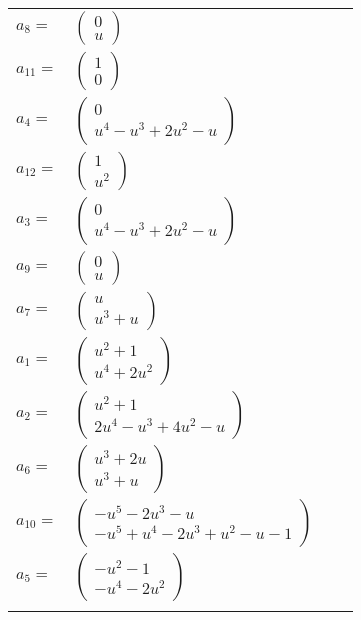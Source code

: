 \documentclass[1p]{elsarticle_modified}
\theoremstyle{definition}
\begin{document}
\begin{tabular}{m{7pt} m{180pt} m{7pt} m{180pt} }
\flushright $a_{8}=$&$\begin{pmatrix}0\\u\end{pmatrix}$ \\
\flushright $a_{11}=$&$\begin{pmatrix}1\\0\end{pmatrix}$ \\
\flushright $a_{4}=$&$\begin{pmatrix}0\\u^4- u^3+2 u^2- u\end{pmatrix}$ \\
\flushright $a_{12}=$&$\begin{pmatrix}1\\u^2\end{pmatrix}$ \\
\flushright $a_{3}=$&$\begin{pmatrix}0\\u^4- u^3+2 u^2- u\end{pmatrix}$ \\
\flushright $a_{9}=$&$\begin{pmatrix}0\\u\end{pmatrix}$ \\
\flushright $a_{7}=$&$\begin{pmatrix}u\\u^3+u\end{pmatrix}$ \\
\flushright $a_{1}=$&$\begin{pmatrix}u^2+1\\u^4+2 u^2\end{pmatrix}$ \\
\flushright $a_{2}=$&$\begin{pmatrix}u^2+1\\2 u^4- u^3+4 u^2- u\end{pmatrix}$ \\
\flushright $a_{6}=$&$\begin{pmatrix}u^3+2 u\\u^3+u\end{pmatrix}$ \\
\flushright $a_{10}=$&$\begin{pmatrix}- u^5-2 u^3- u\\- u^5+u^4-2 u^3+u^2- u-1\end{pmatrix}$ \\
\flushright $a_{5}=$&$\begin{pmatrix}- u^2-1\\- u^4-2 u^2\end{pmatrix}$\\&\end{tabular}
\end{document}
